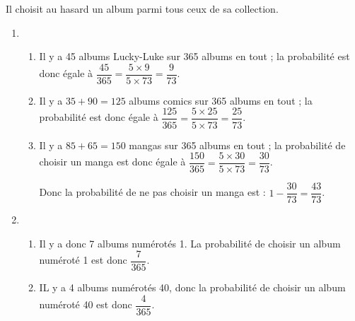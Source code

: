 %
%
 
Il choisit au hasard un album parmi tous ceux de sa collection.
\medskip

\begin{enumerate}
\item 
	\begin{enumerate}
		\item %
Il y a 45 albums \og Lucky-Luke\fg{} sur 365 albums en tout ; la probabilité est donc égale à $\dfrac{45}{365} = \dfrac{5 \times 9}{5 \times 73} = \dfrac{9}{73}$.
		\item %
Il y a $35 + 90 = 125$ albums comics sur 365 albums en tout ; la probabilité est donc égale à $\dfrac{125}{365} = \dfrac{5 \times 25}{5 \times 73} = \dfrac{25}{73}$.
		\item %
Il y a $85 + 65 = 150$ mangas sur 365 albums en tout ; la probabilité de choisir un manga est donc égale à $\dfrac{150}{365} = \dfrac{5 \times 30}{5 \times 73} = \dfrac{30}{73}$.

Donc la probabilité de ne pas choisir un manga est : $1 - \dfrac{30}{73} = \dfrac{43}{73}$.
	\end{enumerate}
\item %
	\begin{enumerate}
		\item %
Il y a donc 7 albums numérotés 1. La probabilité de choisir un album numéroté 1 est donc $\dfrac{7}{365}$.
		\item %
IL y a 4 albums numérotés 40, donc la probabilité de choisir un album numéroté 40 est donc $\dfrac{4}{365}$.
	\end{enumerate}
\end{enumerate}
